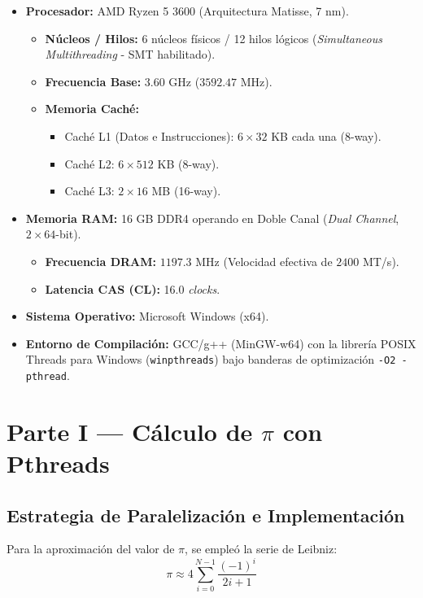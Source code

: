 \documentclass[11pt,a4paper]{article}
\begin{document}
\begin{itemize}
    \item \textbf{Procesador:} AMD Ryzen 5 3600 (Arquitectura Matisse, 7 nm).
    \begin{itemize}
        \item \textbf{Núcleos / Hilos:} 6 núcleos físicos / 12 hilos lógicos (\textit{Simultaneous Multithreading} - SMT habilitado).
        \item \textbf{Frecuencia Base:} $3.60$ GHz ($3592.47$ MHz).
        \item \textbf{Memoria Caché:}
        \begin{itemize}
            \item Caché L1 (Datos e Instrucciones): $6 \times 32$ KB cada una (8-way).
            \item Caché L2: $6 \times 512$ KB (8-way).
            \item Caché L3: $2 \times 16$ MB (16-way).
        \end{itemize}
    \end{itemize}
    
    \item \textbf{Memoria RAM:} 16 GB DDR4 operando en Doble Canal (\textit{Dual Channel}, $2 \times 64$-bit).
    \begin{itemize}
        \item \textbf{Frecuencia DRAM:} $1197.3$ MHz (Velocidad efectiva de $2400$ MT/s).
        \item \textbf{Latencia CAS (CL):} 16.0 \textit{clocks}.
    \end{itemize}

    \item \textbf{Sistema Operativo:} Microsoft Windows (x64).
    \item \textbf{Entorno de Compilación:} GCC/g++ (MinGW-w64) con la librería POSIX Threads para Windows (\texttt{winpthreads}) bajo banderas de optimización \texttt{-O2 -pthread}.
\end{itemize}


\section{Parte I — Cálculo de $\pi$ con Pthreads}

\subsection{Estrategia de Paralelización e Implementación}
Para la aproximación del valor de $\pi$, se empleó la serie de Leibniz:
\begin{equation}
\pi \approx 4 \sum_{i=0}^{N-1} \frac{(-1)^i}{2i + 1}
\end{equation}
\end{document}
